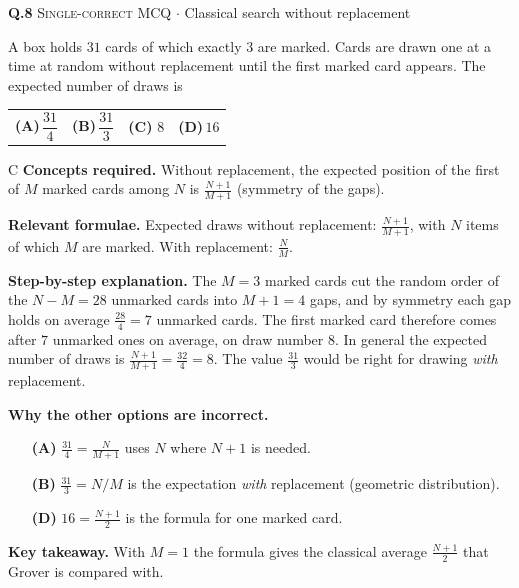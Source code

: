 \documentclass[11pt,a4paper]{article}
\newcommand{\optlabel}[1]{\textbf{(#1)}}
\newcommand{\correctlabel}[1]{\textcolor{okgreen}{\textbf{(#1)}\,\ding{51}}}
\newenvironment{qitem}[1]{\begin{list}{}{\setlength{\leftmargin}{3.3em}\setlength{\labelwidth}{3.1em}%
  \setlength{\labelsep}{0.2em}\setlength{\topsep}{3pt}\setlength{\parsep}{3pt}}\item[\textbf{Q.#1}\hfill]}{\end{list}}
\newcommand{\qsep}{\par\vspace{2pt}{\color{black!15}\hrule}\vspace{4pt}}
\newcommand{\qmeta}[2]{{\footnotesize\color{black!60}\textsc{#1} \;$\cdot$\; #2}\par}
\begin{document}
\begin{qitem}{8}
\qmeta{Single-correct MCQ}{Classical search without replacement}
A box holds $31$ cards of which exactly $3$ are marked. Cards are drawn one at a time at random without replacement until the first
marked card appears. The expected number of draws is
\par\smallskip\noindent\begin{tabularx}{\linewidth}{@{}*{4}{L}@{}}
\optlabel{A}\,$\dfrac{31}{4}$ & \optlabel{B}\,$\dfrac{31}{3}$ & \correctlabel{C}\,$8$ & \optlabel{D}\,$16$
\end{tabularx}
\end{qitem}
\begin{solbox}{C}
\textbf{\color{brand}Concepts required.} Without replacement, the expected position of the first of $M$ marked cards among $N$ is $\frac{N+1}{M+1}$ (symmetry of the gaps).

\textbf{\color{brand}Relevant formulae.} Expected draws without replacement: $\frac{N+1}{M+1}$, with $N$ items of which $M$ are marked. With replacement: $\frac NM$.

\textbf{\color{brand}Step-by-step explanation.} The $M = 3$ marked cards cut the random order of the $N - M = 28$ unmarked cards into $M + 1 = 4$ gaps, and by symmetry each gap
holds on average $\frac{28}{4} = 7$ unmarked cards. The first marked card therefore comes after $7$ unmarked ones on average, on draw number $8$.
In general the expected number of draws is $\frac{N+1}{M+1} = \frac{32}{4} = 8$. The value $\frac{31}{3}$ would be right
for drawing \emph{with} replacement.

\textbf{\color{brand}Why the other options are incorrect.}
\begin{itemize}[leftmargin=2.4em, itemsep=1pt, topsep=2pt]
\item[\textbf{(A)}] $\frac{31}{4} = \frac{N}{M+1}$ uses $N$ where $N + 1$ is needed.
\item[\textbf{(B)}] $\frac{31}{3} = N/M$ is the expectation \emph{with} replacement (geometric distribution).
\item[\textbf{(D)}] $16 = \frac{N+1}{2}$ is the formula for one marked card.
\end{itemize}
\textbf{\color{brand}Key takeaway.} With $M = 1$ the formula gives the classical average $\frac{N+1}{2}$ that Grover is compared with.
\end{solbox}
\qsep
\end{document}
